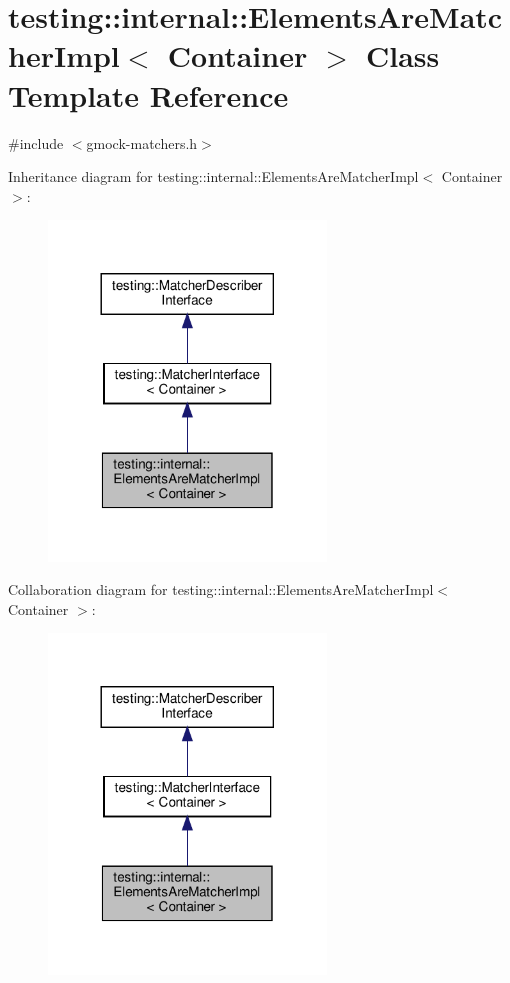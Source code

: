 \hypertarget{classtesting_1_1internal_1_1_elements_are_matcher_impl}{}\section{testing\+:\+:internal\+:\+:Elements\+Are\+Matcher\+Impl$<$ Container $>$ Class Template Reference}
\label{classtesting_1_1internal_1_1_elements_are_matcher_impl}


{\ttfamily \#include $<$gmock-\/matchers.\+h$>$}



Inheritance diagram for testing\+:\+:internal\+:\+:Elements\+Are\+Matcher\+Impl$<$ Container $>$\+:
\nopagebreak
\begin{figure}[H]
\begin{center}
\leavevmode
\includegraphics[width=209pt]{classtesting_1_1internal_1_1_elements_are_matcher_impl__inherit__graph}
\end{center}
\end{figure}


Collaboration diagram for testing\+:\+:internal\+:\+:Elements\+Are\+Matcher\+Impl$<$ Container $>$\+:
\nopagebreak
\begin{figure}[H]
\begin{center}
\leavevmode
\includegraphics[width=209pt]{classtesting_1_1internal_1_1_elements_are_matcher_impl__coll__graph}
\end{center}
\end{figure}
